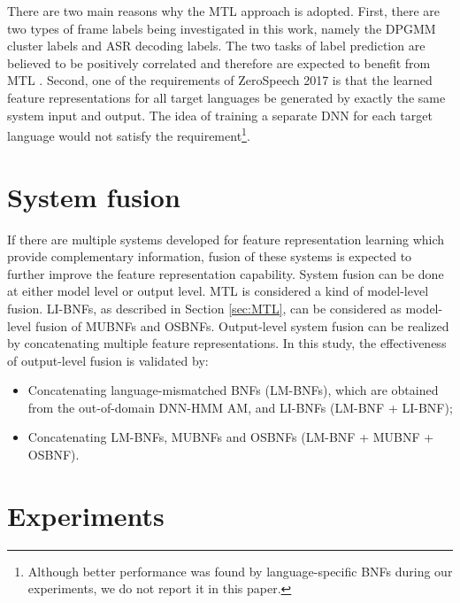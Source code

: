 \documentclass[a4paper]{article}
\begin{document}
There are two main reasons why the MTL approach is adopted. First, there are two types of frame labels being investigated in this work, namely the DPGMM cluster labels and ASR decoding labels. The two tasks of label prediction are believed to be positively correlated and therefore are expected to benefit from MTL \cite{caruana1998multitask}. Second, one of the requirements of ZeroSpeech 2017 is that the learned feature representations for all target languages be generated by exactly the same system input and output. The idea of training a separate DNN for each target language would not satisfy the requirement\footnote{\label{footnote:ffnn}Although better  performance was found by language-specific BNFs during our experiments, we do not report it in this paper.}. 

\section{System fusion}
If there are multiple systems developed for feature representation learning which provide complementary information, fusion of these systems is expected to further improve the feature representation capability.
System fusion can be done at either model level or output level. MTL is considered a kind of model-level fusion. LI-BNFs, as described in Section \ref{sec:MTL}, can be considered as model-level fusion of MUBNFs and OSBNFs. Output-level system fusion can be realized by concatenating multiple feature representations. In this study, the effectiveness of output-level fusion is validated by:
\begin{itemize}
\item[1.] Concatenating language-mismatched BNFs (LM-BNFs), which are obtained from the out-of-domain DNN-HMM AM, and LI-BNFs (LM-BNF + LI-BNF);
\item[2.] Concatenating LM-BNFs, MUBNFs and OSBNFs (LM-BNF + MUBNF + OSBNF).
\end{itemize}

\section{Experiments}
\end{document}
